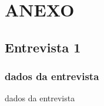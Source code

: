\documentclass[../main.tex]{subfiles}
\begin{document}
\section{ANEXO}
\subsection{Entrevista 1}

\subsubsection{dados da entrevista}
dados da entrevista


\end{document}
